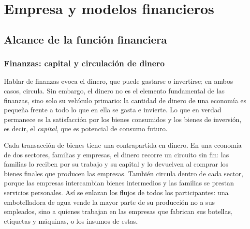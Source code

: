 
\tableofcontents

\chapter{Empresa y modelos financieros}\label{cap:u1}

\begin{ficha}
\end{ficha}
\section{Alcance de la función financiera}\label{sec:u1-alcance}

\subsection{Finanzas: capital y circulación de dinero}

Hablar de finanzas evoca el dinero, que puede gastarse o invertirse; en ambos casos, circula. Sin embargo, el dinero no es el elemento fundamental de las finanzas, sino solo su vehículo primario: la cantidad de dinero de una economía es pequeña frente a todo lo que en ella se gasta e invierte. Lo que en verdad permanece es la satisfacción por los bienes consumidos y los bienes de inversión, es decir, el \emph{capital}, que es potencial de consumo futuro.

Cada transacción de bienes tiene una contrapartida en dinero. En una economía de dos sectores, familias y empresas, el dinero recorre un circuito sin fin: las familias lo reciben por su trabajo y su capital y lo devuelven al comprar los bienes finales que producen las empresas. También circula dentro de cada sector, porque las empresas intercambian bienes intermedios y las familias se prestan servicios personales. Así se enlazan los flujos de todos los participantes: una embotelladora de agua vende la mayor parte de su producción no a sus empleados, sino a quienes trabajan en las empresas que fabrican sus botellas, etiquetas y máquinas, o los insumos de estas.

